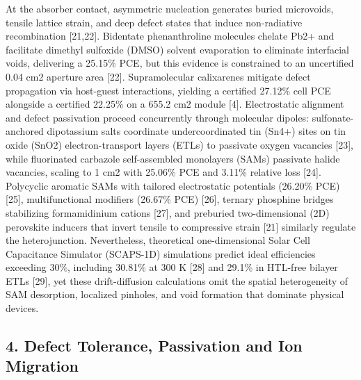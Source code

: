\documentclass[
  11pt,
]{article}
\begin{document}
At the absorber contact, asymmetric nucleation generates buried
microvoids, tensile lattice strain, and deep defect states that induce
non-radiative recombination {[}21,22{]}. Bidentate phenanthroline
molecules chelate Pb2+ and facilitate dimethyl sulfoxide (DMSO) solvent
evaporation to eliminate interfacial voids, delivering a 25.15\% PCE,
but this evidence is constrained to an uncertified 0.04 cm2 aperture
area {[}22{]}. Supramolecular calixarenes mitigate defect propagation
via host-guest interactions, yielding a certified 27.12\% cell PCE
alongside a certified 22.25\% on a 655.2 cm2 module {[}4{]}.
Electrostatic alignment and defect passivation proceed concurrently
through molecular dipoles: sulfonate-anchored dipotassium salts
coordinate undercoordinated tin (Sn4+) sites on tin oxide (SnO2)
electron-transport layers (ETLs) to passivate oxygen vacancies {[}23{]},
while fluorinated carbazole self-assembled monolayers (SAMs) passivate
halide vacancies, scaling to 1 cm2 with 25.06\% PCE and 3.11\% relative
loss {[}24{]}. Polycyclic aromatic SAMs with tailored electrostatic
potentials (26.20\% PCE) {[}25{]}, multifunctional modifiers (26.67\%
PCE) {[}26{]}, ternary phosphine bridges stabilizing formamidinium
cations {[}27{]}, and preburied two-dimensional (2D) perovskite inducers
that invert tensile to compressive strain {[}21{]} similarly regulate
the heterojunction. Nevertheless, theoretical one-dimensional Solar Cell
Capacitance Simulator (SCAPS-1D) simulations predict ideal efficiencies
exceeding 30\%, including 30.81\% at 300 K {[}28{]} and 29.1\% in
HTL-free bilayer ETLs {[}29{]}, yet these drift-diffusion calculations
omit the spatial heterogeneity of SAM desorption, localized pinholes,
and void formation that dominate physical devices.

\subsection{4. Defect Tolerance, Passivation and Ion
Migration}\label{defect-tolerance-passivation-and-ion-migration}
\end{document}
